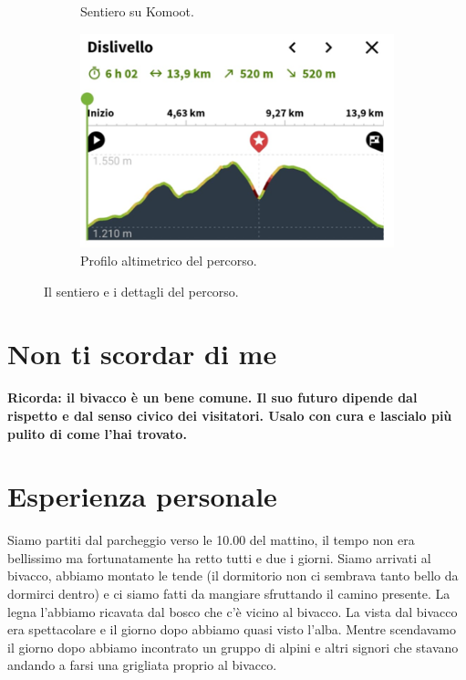 \documentclass{article}
\begin{document}
\begin{figure}[htbp!]
\begin{subfigure}[t]{0.45\textwidth}
        \caption{Sentiero su Komoot.}
        \label{fig:foto_corta1}
        \vspace{1em} %
        \includegraphics[width=\textwidth]{images/profilo_altimetrico.png}
        \caption{Profilo altimetrico del percorso.}
        \label{fig:foto_corta2}
    \end{subfigure}
    \caption{Il sentiero e i dettagli del percorso.}
    \label{fig:panoramica_dettagli}
\end{figure}


\section{Non ti scordar di me}
\textbf{\textcolor{BurntOrange}{Ricorda: il bivacco è un bene comune. Il suo futuro dipende dal rispetto e dal senso civico dei visitatori. Usalo con cura e lascialo più pulito di come l'hai trovato.}}


\section{Esperienza personale}
Siamo partiti dal parcheggio verso le 10.00 del mattino, il tempo non era bellissimo ma fortunatamente ha retto tutti e due i giorni. Siamo arrivati al bivacco, abbiamo montato le tende (il dormitorio non ci sembrava tanto bello da dormirci dentro) e ci siamo fatti da mangiare sfruttando il camino presente. La legna l'abbiamo ricavata dal bosco che c'è vicino al bivacco. La vista dal bivacco era spettacolare e il giorno dopo abbiamo quasi visto l'alba. Mentre scendavamo il giorno dopo abbiamo incontrato un gruppo di alpini e altri signori che stavano andando a farsi una grigliata proprio al bivacco.
\end{document}
